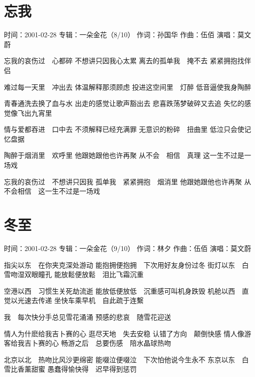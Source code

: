 \documentclass[UTF8,a4paper,oneside,twocolumn,12pt]{ctexbook}
\newcommand{\infopair}[2]{\textbullet #1：#2}
\newcommand{\zc}[1][伍佰]{\infopair{作词}{#1}}
\newcommand{\zq}[1][伍佰]{\infopair{作曲}{#1}}
\newcommand{\zj}[1]{\infopair{专辑}{#1}}
\newcommand{\sj}[1]{\infopair{时间}{#1}}
\newenvironment{info}{\begin{flushleft}\kaishu
	}
	{\end{flushleft}\normalsize\yahei\par}
\newenvironment{lyric}{
	}
{}
\begin{document}
\section{忘我}
\begin{info}
	\sj{2001-02-28}
	\zj{一朵金花（8/10）}
	\zc[孙国华]
	\zq
	\infopair{演唱}{莫文蔚}
\end{info}
\begin{lyric}
	忘我的哀伤过　心都碎
	不想讲只因我心太累
	离去的孤单我　掩不去
	紧紧拥抱找伴侣

	难过每一天里　冲出去
	体温解释那须顾虑
	投进这空间里　灯醉
	低音逼使我身陶醉

	青春通洗去换了血与水
	出走的感觉让歌声豁出去
	悲喜跌荡梦破碎又去追
	失忆的感觉像飞出九宵里

	情与爱都吞进　口中去
	不须解释已经充满罪
	无意识的粉碎　扭曲里
	低泣只会使记忆盘据

	陶醉于烟消里　欢呼里
	他跟她跟他也许再聚
	从不会　相信　真理
	这一生不过是一场戏

	忘我的哀伤过　不想讲只因我
	孤单我　紧紧拥抱　烟消里
	他跟她跟他也许再聚
	从不会相信　这一生不过是一场戏
\end{lyric}

\section{冬至}
\begin{info}
	\sj{2001-02-28}
	\zj{一朵金花（9/10）}
	\zc[林夕]
	\zq
	\infopair{演唱}{莫文蔚}
\end{info}
\begin{lyric}
	指尖以东　在你夹克深处游动
	能抱拥便抱拥　下次用好友身份过冬
	街灯以东　白雪吻湿双眼瞳孔
	能放鬆便放鬆　泪比飞霜沉重

	空港以西　习惯生关死劫流逝
	能放低便放低　沉重感可叫机身跌毁
	机舱以西　直觉以光速去传递
	坐快车乘早机　自此疏于连繫

	我　每次快分手总见雪花涌涌
	预感的悲哀　随雪花迎送

	情人为什麽给我吉卜赛的心
	逛尽天地　失去安稳
	认错了方向　颠倒快感
	情人像游客给我吉卜赛的心
	畅游之后　总要伤感　陪水晶球热吻

	北京以北　热吻比风沙更绵密
	能啜泣便啜泣　下次怕他说今生永不
	东京以东　白雪比香薰甜蜜
	愚蠢得愉快得　迟早得到惩罚
\end{lyric}
\end{document}
